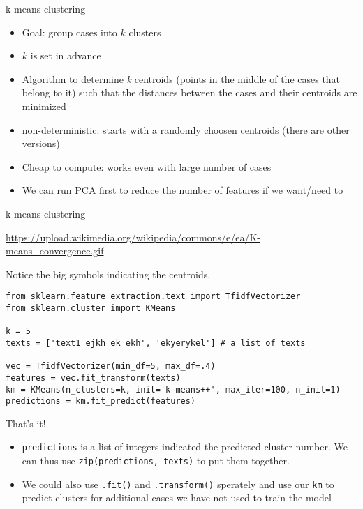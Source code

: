 \documentclass[compress]{beamer}
\begin{document}
\begin{frame}{k-means clustering}
\begin{itemize}[<+->]
\item Goal: group cases into $k$ clusters
\item $k$ is set in advance
\item Algorithm to determine \textit{k} centroids (points in the middle of the cases that belong to it) such that the distances between the cases and their centroids are minimized
\item non-deterministic: starts with a randomly choosen centroids (there are other versions)
\item Cheap to compute: works even with large number of cases
\item We can run PCA first to reduce the number of features if we want/need to
\end{itemize}
\end{frame}




\begin{frame}{k-means clustering}

{\tiny{\url{https://upload.wikimedia.org/wikipedia/commons/e/ea/K-means\_convergence.gif}}}

Notice the big symbols indicating the centroids.
\end{frame}


\begin{frame}
\begin{lstlisting}
from sklearn.feature_extraction.text import TfidfVectorizer
from sklearn.cluster import KMeans

k = 5
texts = ['text1 ejkh ek ekh', 'ekyerykel'] # a list of texts

vec = TfidfVectorizer(min_df=5, max_df=.4)
features = vec.fit_transform(texts)
km = KMeans(n_clusters=k, init='k-means++', max_iter=100, n_init=1)
predictions = km.fit_predict(features)

\end{lstlisting}

That's it!
\pause

\begin{itemize}
\item \texttt{predictions} is a list of integers indicated the predicted cluster number. We can thus use \texttt{zip(predictions, texts)} to put them together.
\item<+-> We could also use \texttt{.fit()} and \texttt{.transform()} sperately and use our \texttt{km} to predict clusters for additional cases we have not used to train the model
\end{itemize}

\end{frame}
\end{document}
